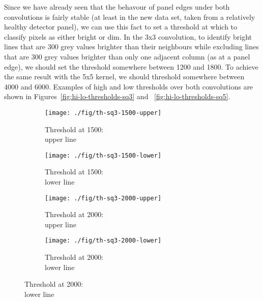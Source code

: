 \documentclass[10pt,fleqn]{article}
\begin{document}
Since we have already seen that the behavour of panel edges under both convolutions is fairly stable (at least in the new data set, taken from a relatively healthy detector panel), we can use this fact to set a threshold at which to classify pixels as either bright or dim. In the 3x3 convolution, to identify bright lines that are 300 grey values brighter than their neighbours while excluding lines that are 300 grey values brighter than only one adjacent column (as at a panel edge), we should set the threshold somewhere between 1200 and 1800. To achieve the same result with the 5x5 kernel, we should threshold somewhere between 4000 and 6000. Examples of high and low thresholds over both convolutions are shown in Figures~\ref{fig:hi-lo-thresholds-sq3} and ~\ref{fig:hi-lo-thresholds-sq5}.

\begin{figure}[!ht]
\caption{High and low thresholds applied after convolution with 3x3 kernel}
\label{fig:hi-lo-thresholds-sq3}
\centering
%
\begin{subfigure}[t]{0.24\textwidth}
\caption{Threshold at 1500: \\upper line}
\texttt{[image: ./fig/th-sq3-1500-upper]}
\end{subfigure}
%
\begin{subfigure}[t]{0.24\textwidth}
\caption{Threshold at 1500: \\lower line}
\texttt{[image: ./fig/th-sq3-1500-lower]}
\end{subfigure}
%
\begin{subfigure}[t]{0.24\textwidth}
\caption{Threshold at 2000: \\upper line}
\texttt{[image: ./fig/th-sq3-2000-upper]}
\end{subfigure}
%
\begin{subfigure}[t]{0.24\textwidth}
\caption{Threshold at 2000: \\lower line}
\texttt{[image: ./fig/th-sq3-2000-lower]}
\end{subfigure}
%
\end{figure}
\end{document}
